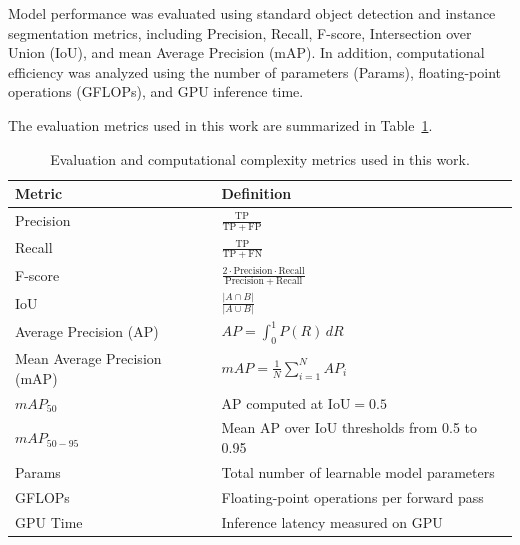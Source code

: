 \documentclass[runningheads]{llncs}
\begin{document}
Model performance was evaluated using standard object detection and instance
segmentation metrics, including Precision, Recall, F-score, Intersection over
Union (IoU), and mean Average Precision (mAP). In addition, computational
efficiency was analyzed using the number of parameters (Params), floating-point
operations (GFLOPs), and GPU inference time.

The evaluation metrics used in this work are summarized in
Table~\ref{tab:metrics}.

\begin{table}[t]
\centering
\caption{Evaluation and computational complexity metrics used in this work.}
\label{tab:metrics}

\renewcommand{\arraystretch}{1.8}
\setlength{\tabcolsep}{4pt}

\small

\begin{tabular}{l p{5.7cm}}
\hline
\textbf{Metric} & \textbf{Definition} \\
\hline

Precision &
$\displaystyle \frac{\mathrm{TP}}{\mathrm{TP} + \mathrm{FP}}$ \\[0.4mm]

Recall &
$\displaystyle \frac{\mathrm{TP}}{\mathrm{TP} + \mathrm{FN}}$ \\[0.4mm]

F-score &
$\displaystyle \frac{2 \cdot \mathrm{Precision} \cdot \mathrm{Recall}}
{\mathrm{Precision} + \mathrm{Recall}}$ \\[0.6mm]

IoU &
$\displaystyle \frac{|A \cap B|}{|A \cup B|}$ \\[0.6mm]

Average Precision (AP) &
$\displaystyle AP = \int_{0}^{1} P(R)\, dR$ \\[0.6mm]

Mean Average Precision (mAP) &
$\displaystyle mAP = \frac{1}{N}
\sum_{i=1}^{N} AP_i$ \\[0.6mm]

$mAP_{50}$ &
AP computed at $\mathrm{IoU}=0.5$ \\[0.4mm]

$mAP_{50-95}$ &
Mean AP over IoU thresholds from 0.5 to 0.95 \\[0.4mm]

Params &
Total number of learnable model parameters \\[0.4mm]

GFLOPs &
Floating-point operations per forward pass \\[0.4mm]

GPU Time &
Inference latency measured on GPU \\

\hline
\end{tabular}
\end{table}
\end{document}
